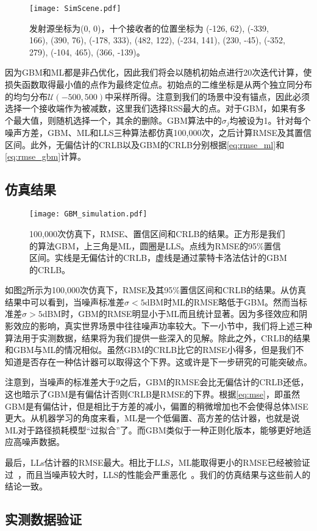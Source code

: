 \begin{figure}
	\centering
	\texttt{[image: SimScene.pdf]}
	\caption{发射源坐标为(0, 0)，十个接收者的位置坐标为 (-126, 62), (-339, 166), (390, 76), (-178, 333), (482, 122), (-234, 141), (230, -45), (-352, 279), (-104, 465), (366, -139)。}
	\label{fig:simscene}
\end{figure}

因为GBM和ML都是非凸优化，因此我们将会以随机初始点进行20次迭代计算，使损失函数取得最小值的点作为最终定位点。初始点的二维坐标是从两个独立同分布的均匀分布$\mathcal{U}(-500, 500)$中采样所得。注意到我们的场景中没有锚点，因此必须选择一个接收端作为被减数，这里我们选择RSS最大的点。对于GBM，如果有多个最大值，则随机选择一个，其余的删除。GBM算法中的$\sigma_j$均被设为1。针对每个噪声方差，GBM、ML和LLS三种算法都仿真100,000次，之后计算RMSE及其置信区间。此外，无偏估计的CRLB以及GBM的CRLB分别根据\eqref{eq:rmse_ml}和\eqref{eq:rmse_gbm}计算。

\subsection{仿真结果}

\begin{figure}
	\centering
	\texttt{[image: GBM\_simulation.pdf]}
	\caption{100,000次仿真下，RMSE、置信区间和CRLB的结果。正方形是我们的算法GBM，上三角是ML，圆圈是LLS。点线为RMSE的95\%置信区间。实线是无偏估计的CRLB，虚线是通过蒙特卡洛法估计的GBM的CRLB。}
	\label{fig:gbm_sim}
\end{figure}

如图\ref{fig:gbm_sim}所示为100,000次仿真下，RMSE及其95\%置信区间和CRLB的结果。从仿真结果中可以看到，当噪声标准差$\sigma<5$dBM时ML的RMSE略低于GBM。然而当标准差$\sigma>5$dBM时，GBM的RMSE明显小于ML而且统计显著。因为多径效应和阴影效应的影响，真实世界场景中往往噪声功率较大。下一小节中，我们将上述三种算法用于实测数据，结果将为我们提供一些深入的见解。除此之外，CRLB的结果和GBM与ML的情况相似。虽然GBM的CRLB比它的RMSE小得多，但是我们不知道是否存在一种估计器可以取得这个下界。这或许是下一步研究的可能突破点。

注意到，当噪声的标准差大于9之后，GBM的RMSE会比无偏估计的CRLB还低，这也暗示了GBM是有偏估计否则CRLB是RMSE的下界。根据\eqref{eq:mse}，即虽然GBM是有偏估计，但是相比于方差的减小，偏置的稍微增加也不会使得总体MSE更大。从机器学习的角度来看，ML是一个低偏置、高方差的估计器，也就是说ML对于路径损耗模型“过拟合”了。而GBM类似于一种正则化版本，能够更好地适应高噪声数据。

最后，LLs估计器的RMSE最大。相比于LLS，ML能取得更小的RMSE已经被验证过~\cite{jackson2011received}，而且当噪声较大时，LLS的性能会严重恶化~\cite{vaghefi2013cooperative}。我们的仿真结果与这些前人的结论一致。

\subsection{实测数据验证}



